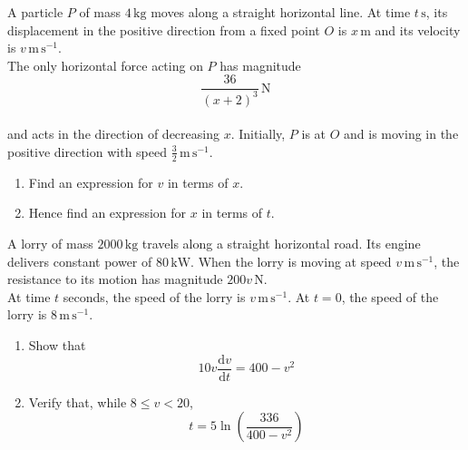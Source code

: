 \documentclass[leqno]{article}
\begin{document}
\djsFrontMatter
\begin{enumerate}[
  label=\textbf{\arabic*.},
  leftmargin=*,
  topsep=0pt,
  partopsep=0pt,
  parsep=0pt
]

\questionitem

A particle $P$ of mass $4\,\mathrm{kg}$ moves along a straight horizontal line. At time $t\,\mathrm{s}$, its displacement in the positive direction from a fixed point $O$ is $x\,\mathrm{m}$ and its velocity is $v\,\mathrm{m\,s^{-1}}$. \\

The only horizontal force acting on $P$ has magnitude
\[
\dfrac{36}{(x+2)^3}\,\mathrm{N}
\] \\
and acts in the direction of decreasing $x$. Initially, $P$ is at $O$ and is moving in the positive direction with speed $\frac{3}{2}\,\mathrm{m\,s^{-1}}$. \\

\begin{enumerate}[label=\textbf{(\alph*)}]
  \item Find an expression for $v$ in terms of $x$.  \\
  \item Hence find an expression for $x$ in terms of $t$.  \\
\end{enumerate}

\newpage

\questionitem

A lorry of mass $2000\,\mathrm{kg}$ travels along a straight horizontal road. Its engine delivers constant power of $80\,\mathrm{kW}$. When the lorry is moving at speed $v\,\mathrm{m\,s^{-1}}$, the resistance to its motion has magnitude $200v\,\mathrm{N}$. \\

At time $t$ seconds, the speed of the lorry is $v\,\mathrm{m\,s^{-1}}$. At $t=0$, the speed of the lorry is $8\,\mathrm{m\,s^{-1}}$. \\

\begin{enumerate}[label=\textbf{(\alph*)}]
  \item Show that
  \[
  10v\dfrac{\mathrm{d}v}{\mathrm{d}t}=400-v^2
  \]
  \item Verify that, while $8\leq v<20$,
  \[
  t=5\ln\left(\dfrac{336}{400-v^2}\right)
  \]
\end{enumerate}


\end{enumerate}
\end{document}
